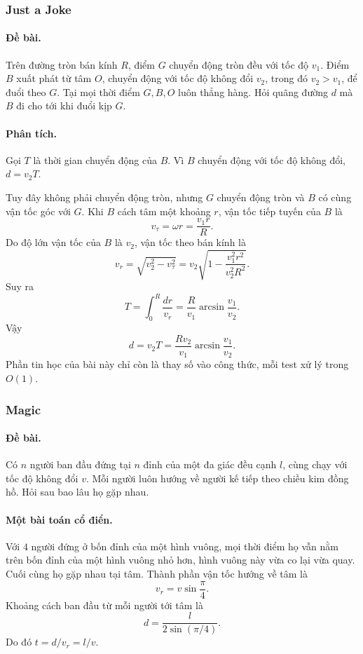 \documentclass[11pt]{article}
\begin{document}
\subsubsection{Just a Joke}

\paragraph{Đề bài.}
Trên đường tròn bán kính \(R\), điểm \(G\) chuyển động tròn đều với tốc độ
\(v_1\). Điểm \(B\) xuất phát từ tâm \(O\), chuyển động với tốc độ không đổi
\(v_2\), trong đó \(v_2>v_1\), để đuổi theo \(G\). Tại mọi thời điểm \(G,B,O\)
luôn thẳng hàng. Hỏi quãng đường \(d\) mà \(B\) đi cho tới khi đuổi kịp \(G\).

\paragraph{Phân tích.}
Gọi \(T\) là thời gian chuyển động của \(B\). Vì \(B\) chuyển động với tốc độ
không đổi, \(d=v_2T\).

Tuy đây không phải chuyển động tròn, nhưng \(G\) chuyển động tròn và \(B\) có
cùng vận tốc góc với \(G\). Khi \(B\) cách tâm một khoảng \(r\), vận tốc tiếp
tuyến của \(B\) là
\[
  v_\tau=\omega r=\frac{v_1r}{R}.
\]
Do độ lớn vận tốc của \(B\) là \(v_2\), vận tốc theo bán kính là
\[
  v_r=\sqrt{v_2^2-v_\tau^2}
      =v_2\sqrt{1-\frac{v_1^2r^2}{v_2^2R^2}}.
\]
Suy ra
\[
  T=\int_0^R\frac{dr}{v_r}
    =\frac{R}{v_1}\arcsin\frac{v_1}{v_2}.
\]
Vậy
\[
  d=v_2T=\frac{Rv_2}{v_1}\arcsin\frac{v_1}{v_2}.
\]
Phần tin học của bài này chỉ còn là thay số vào công thức, mỗi test xử lý trong
\(O(1)\).

\subsubsection{Magic}

\paragraph{Đề bài.}
Có \(n\) người ban đầu đứng tại \(n\) đỉnh của một đa giác đều cạnh \(l\), cùng
chạy với tốc độ không đổi \(v\). Mỗi người luôn hướng về người kế tiếp theo
chiều kim đồng hồ. Hỏi sau bao lâu họ gặp nhau.

\paragraph{Một bài toán cổ điển.}
Với \(4\) người đứng ở bốn đỉnh của một hình vuông, mọi thời điểm họ vẫn nằm
trên bốn đỉnh của một hình vuông nhỏ hơn, hình vuông này vừa co lại vừa quay.
Cuối cùng họ gặp nhau tại tâm. Thành phần vận tốc hướng về tâm là
\[
  v_r=v\sin\frac{\pi}{4}.
\]
Khoảng cách ban đầu từ mỗi người tới tâm là
\[
  d=\frac{l}{2\sin(\pi/4)}.
\]
Do đó \(t=d/v_r=l/v\).
\end{document}
